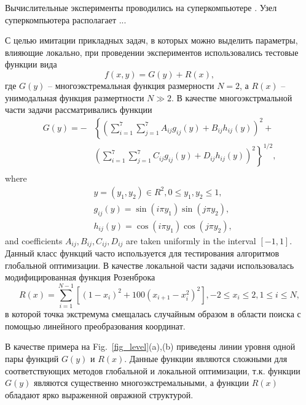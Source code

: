 \documentclass{svproc}
\begin{document}
Вычислительные эксперименты проводились на суперкомпьютере . 
Узел суперкомпьютера располагает ... 

С целью имитации прикладных задач, в которых можно выделить параметры, влияющие локально, при проведении экспериментов использовались тестовые функции вида 
\begin{equation}\label{test_problem}
f(x,y) = G(y)+R(x),
\end{equation}
где $G(y)$ -- многоэкстремальная функция размерности $N=2$, а $R(x)$ -- унимодальная функция размертности $N \gg 2$.
В качестве многоэкстрмальной части задачи рассматривались функции 
\begin{eqnarray} \nonumber \label{vagris}
G(y)= -&\left\{\left(\sum^{7}_{i=1}\sum^{7}_{j=1}A_{ij}g_{ij}(y)+B_{ij}h_{ij}(y)\right)^2+\right. \\
&\left.\left(\sum^{7}_{i=1}\sum^{7}_{j=1}C_{ij}g_{ij}(y)+D_{ij}h_{ij}(y)\right)^2\right\}^{1/2},\\ \nonumber
\end{eqnarray}
where
\begin{eqnarray} \nonumber
& y=(y_1,y_2)\in R^2, 0 \leq y_1,y_2 \leq 1, \\ \nonumber
& g_{ij}(y)=\sin(i\pi y_1)\sin(j\pi y_2),  \\ \nonumber
& h_{ij}(y)=\cos(i\pi y_1)\cos(j\pi y_2), \nonumber 
\end{eqnarray}
and coefficients $A_{ij}, B_{ij}, C_{ij}, D_{ij}$  are taken uniformly in the interval $[-1,1]$.
Данный класс функций часто используется для тестирования алгоритмов глобальной оптимизации.  
В качестве локальной части задачи использовалась модифицированная функция Розенброка 
\[
R(x)= \sum_{i=1}^{N-1}{\left[(1-x_i)^2+100(x_{i+1}-x_i^2)^2\right]}, -2 \leq x_i \leq 2 , 1\leq i\leq N,
\]
в которой точка экстремума смещалась случайным образом в области поиска с помощью линейного преобразования координат.

В качестве примера на Fig.~\ref{fig_level}(a),(b) приведены линии уровня одной пары функций $G(y)$ и $R(x)$. Данные функции являются сложными для соответствующих методов глобальной и локальной оптимизации, т.к. функции $G(y)$ являются существенно многоэкстремальными, а функции $R(x)$ обладают ярко выраженной овражной структурой.
\end{document}
